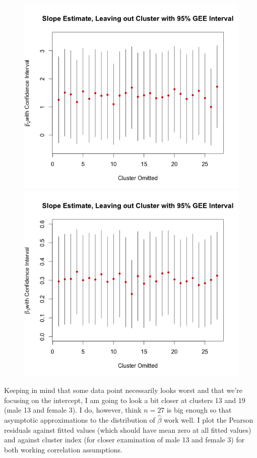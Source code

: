 \documentclass[11pt]{article}
\begin{document}
\begin{enumerate}
\begin{figure}[H]
			\includegraphics[scale=0.4]{RplotDDExchGEEBeta2.png}
			\includegraphics[scale=0.4]{RplotDDExchGEEBeta3.png}	
		\end{figure}
		Keeping in mind that some data point necessarily looks worst and that we're focusing on the intercept, I am going to look a bit closer at clusters 13 and 19 (male 13 and female 3). I do, however, think $n=27$ is big enough so that asymptotic approximations to the distribution of $\widehat\beta$ work well. I plot the Pearson residuals against fitted values (which should have mean zero at all fitted values) and against cluster index (for closer examination of male 13 and female 3) for both working correlation assumptions.

\end{enumerate}
\end{document}

